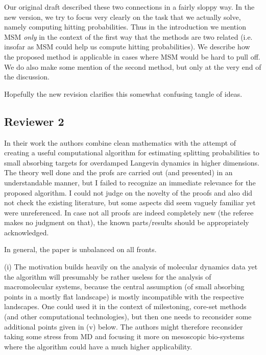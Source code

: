 \documentclass{article}
\begin{document}
{Our original draft described these two connections in a fairly sloppy way.  In the new version, we try to focus very clearly on the task that we actually solve, namely computing hitting probabilities.  Thus in the introduction we mention MSM \emph{only} in the context of the first way that the methods are two related (i.e. insofar as MSM could help us compute hitting probabilities).  We describe how the proposed method is applicable in cases where MSM would be hard to pull off.  We do also make some mention of the second method, but only at the very end of the discussion.

Hopefully the new revision clarifies this somewhat confusing tangle of ideas.  

}



\subsection{Reviewer 2}

In their work the authors combine clean mathematics with the attempt
of creating a useful computational algorithm for estimating splitting
probabilities to small absorbing targets for overdamped Langevin
dynamics in higher dimensions. The theory well done and the profs are
carried out (and presented) in an understandable manner, but I failed
to recognize an immediate relevance for the proposed algorithm. I
could not judge on the novelty of the proofs and also did not check
the existing literature, but some aspects did seem vaguely familiar
yet were unreferenced. In case not all proofs are indeed completely
new (the referee makes no judgment on that), the known parts/results
should be appropriately acknowledged.

In general, the paper is unbalanced on all fronts.

(i) The motivation builds heavily on the analysis of molecular
dynamics data yet the algorithm will presumably be rather useless for
the analysis of macromolecular systems, because the central assumption
(of small absorbing points in a mostly flat landscape) is mostly
incompatible with the respective landscapes. One could used it in the
context of milestoning, core-set methods (and other computational
technologies), but then one needs to reconsider some additional points
given in (v) below. The authors might therefore reconsider taking some
stress from MD and focusing it more on mesoscopic bio-systems where
the algorithm could have a much higher applicability.
\end{document}
